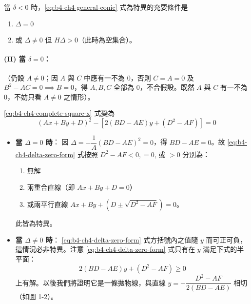 \begin{proposition}
當 $\delta < 0$ 時，\eqref{eq:b4-ch4-general-conic} 式為特異的充要條件是
\begin{enumerate}[(1)]
  \item $\Delta = 0$
  \item 或 $\Delta \ne 0$ 但 $H\Delta > 0$（此時為空集合）。
\end{enumerate}
\end{proposition}

\paragraph*{(II) 當 $\delta = 0$：} （仍設 $A \ne 0$；因 $A$ 與 $C$ 中應有一不為 0，否則 $C = A = 0$ 及 $B^2 - AC = 0 \implies B = 0$，得 $A, B, C$ 全部為 0，不合假設。既然 $A$ 與 $C$ 有一不為 0，不妨只看 $A \ne 0$ 之情形）。

\eqref{eq:b4-ch4-complete-square-x} 式變為
\begin{equation}
(Ax + By + D)^2 - [2(BD - AE)y + (D^2 - AF)] = 0
\label{eq:b4-ch4-delta-zero-form}
\end{equation}

\begin{itemize}
  \item[(i)] \textbf{當 $\Delta = 0$ 時}：
  因 $\Delta = -\dfrac{1}{A}(BD - AE)^2 = 0$，得 $BD - AE = 0$。故 \eqref{eq:b4-ch4-delta-zero-form} 式按照 $D^2 - AF < 0, = 0$, 或 $> 0$ 分別為：
  \begin{enumerate}[(1)]
    \item 無解
    \item 兩重合直線（即 $Ax + By + D = 0$）
    \item 或兩平行直線 $Ax + By + (D \pm \sqrt{D^2 - AF}) = 0$。
  \end{enumerate}
  此皆為特異。

  \item[(ii)] \textbf{當 $\Delta \ne 0$ 時}：
  \eqref{eq:b4-ch4-delta-zero-form} 式方括號內之值隨 $y$ 而可正可負，這情況必非特異。注意 \eqref{eq:b4-ch4-delta-zero-form} 式只有在 $y$ 滿足下式的半平面：
  \[
  2(BD - AE)y + (D^2 - AF) \ge 0
  \]
  上有解。以後我們將證明它是一條拋物線，與直線 $y = -\dfrac{D^2 - AF}{2(BD - AE)}$ 相切（如圖 1-2）。
\end{itemize}

